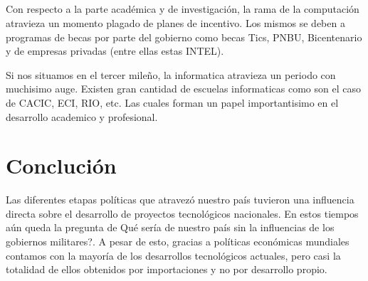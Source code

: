 \documentclass[%
 	final,
%
	notitlepage,
	narroweqnarray,
	inline,
 	twoside,
	]{ieee}
\begin{document}
\subsection*{}
Con respecto a la parte acad\'emica y de investigaci\'on, la rama de la computaci\'on atravieza un momento plagado de planes de incentivo. Los mismos se deben a programas de becas por parte del gobierno como becas Tics, PNBU, Bicentenario y de empresas privadas (entre ellas estas INTEL).

Si nos situamos en el tercer mile\~no, la informatica atravieza un periodo con muchisimo auge. Existen gran cantidad de escuelas informaticas como son el caso de CACIC, ECI, RIO, etc. Las cuales forman un papel importantisimo en el desarrollo academico y profesional.








\section{Concluci\'on}
Las diferentes etapas pol\'iticas que atravez\'o nuestro pa\'is tuvieron una influencia directa sobre el desarrollo de proyectos tecnol\'ogicos nacionales. En estos tiempos a\'un queda la pregunta de \textquestiondown Qu\'e ser\'ia de nuestro pa\'is sin la influencias de los gobiernos militares?.
A pesar de esto, gracias a pol\'iticas econ\'omicas mundiales contamos con la mayor\'ia de los desarrollos tecnol\'ogicos actuales, pero casi la totalidad de ellos obtenidos por importaciones y no por desarrollo propio.
\end{document}
